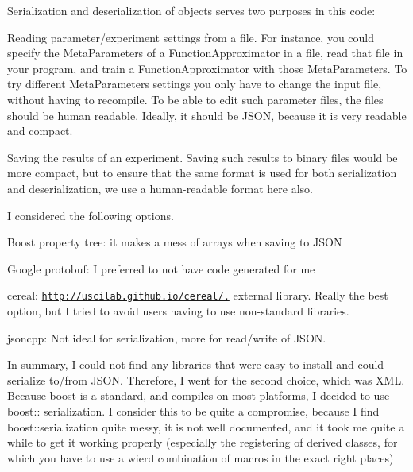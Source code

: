 Serialization and deserialization of objects serves two purposes in this code\+:

\begin{DoxyItemize}
\item Reading parameter/experiment settings from a file. For instance, you could specify the Meta\+Parameters of a Function\+Approximator in a file, read that file in your program, and train a Function\+Approximator with those Meta\+Parameters. To try different Meta\+Parameters settings you only have to change the input file, without having to recompile. To be able to edit such parameter files, the files should be human readable. Ideally, it should be J\+S\+O\+N, because it is very readable and compact.\end{DoxyItemize}
\begin{DoxyItemize}
\item Saving the results of an experiment. Saving such results to binary files would be more compact, but to ensure that the same format is used for both serialization and deserialization, we use a human-\/readable format here also.\end{DoxyItemize}
I considered the following options.

\begin{DoxyItemize}
\item Boost property tree\+: it makes a mess of arrays when saving to J\+S\+O\+N\end{DoxyItemize}
\begin{DoxyItemize}
\item Google protobuf\+: I preferred to not have code generated for me\end{DoxyItemize}
\begin{DoxyItemize}
\item cereal\+: \href{http://uscilab.github.io/cereal/,}{\tt http\+://uscilab.\+github.\+io/cereal/,} external library. Really the best option, but I tried to avoid users having to use non-\/standard libraries.\end{DoxyItemize}
\begin{DoxyItemize}
\item jsoncpp\+: Not ideal for serialization, more for read/write of J\+S\+O\+N.\end{DoxyItemize}
In summary, I could not find any libraries that were easy to install and could serialize to/from J\+S\+O\+N. Therefore, I went for the second choice, which was X\+M\+L. Because boost is a standard, and compiles on most platforms, I decided to use boost\+:\+: serialization. I consider this to be quite a compromise, because I find boost\+::serialization quite messy, it is not well documented, and it took me quite a while to get it working properly (especially the registering of derived classes, for which you have to use a wierd combination of macros in the exact right places)

